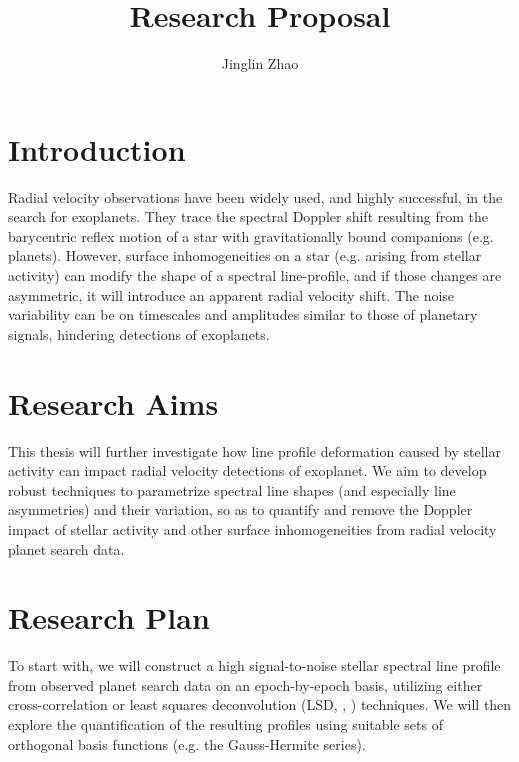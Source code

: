 \documentclass[a4paper]{article}
\title{Research Proposal}
\author{Jinglin Zhao}
\begin{document}
\maketitle

\section{Introduction}

Radial velocity observations have been widely used, and highly successful, in the search for exoplanets. They trace the spectral Doppler shift resulting from the barycentric reflex motion of a star with gravitationally bound companions (e.g. planets). However, surface inhomogeneities on a star (e.g. arising from stellar activity) can modify the shape of a spectral line-profile, and if those changes are asymmetric, it will introduce an apparent radial velocity shift. The noise variability can be on timescales and amplitudes similar to those of planetary signals, hindering detections of exoplanets. 

\section{Research Aims}

This thesis will further investigate how line profile deformation caused by stellar activity can impact radial velocity detections of exoplanet. We aim to develop robust techniques to parametrize spectral line shapes (and especially line asymmetries) and their variation, so as to quantify and remove the Doppler impact of stellar activity and other surface inhomogeneities from radial velocity planet search data. 



\section{Research Plan}

To start with, we will construct a high signal-to-noise stellar spectral line profile from observed planet search data on an epoch-by-epoch basis, utilizing either cross-correlation or least squares deconvolution (LSD, \cite{Donati1997}, \cite{Kochukhov2010}) techniques. We will then explore the quantification of the resulting profiles using suitable sets of orthogonal basis functions (e.g. the Gauss-Hermite series).
\end{document}
